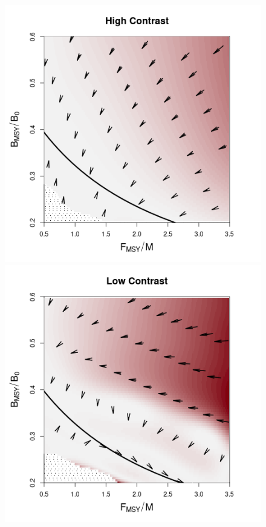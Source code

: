 %
\begin{figure}[h!]
\begin{minipage}[h!]{0.44\textwidth}
\includegraphics[width=\textwidth]{../ddBias/directionalBiasDDSubExpT45N150A0-1AS4K0.2N38Reds 2.png}
\end{minipage}
\begin{minipage}[h!]{0.44\textwidth}%
\includegraphics[width=\textwidth]{../ddBias/directionalBiasDDSubFlatT45N150A0-1AS1K0.5N56Reds 2.png}

\end{minipage}
\end{figure}
